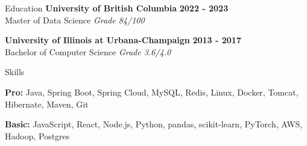 \documentclass{resume} %
\begin{document}
\begin{rSection}{Education}
{\bf University of British Columbia} \hfill {\bf 2022 - 2023}
\\ {Master of Data Science} \hfill {\em{Grade 84/100}}

{\bf University of Illinois at Urbana-Champaign} \hfill {\bf 2013 - 2017}
\\ {Bachelor of Computer Science} \hfill {\em{Grade 3.6/4.0}}
\end{rSection}

\begin{skillSection}{Skills}
\item {\bf Pro:} Java, Spring Boot, Spring Cloud, MySQL, Redis, Linux, Docker, Tomcat, Hibernate, Maven, Git
\item {\bf Basic:} JavaScript, React, Node.js, Python, pandas, scikit-learn, PyTorch, AWS, Hadoop, Postgres
\end{skillSection}
\end{document}
